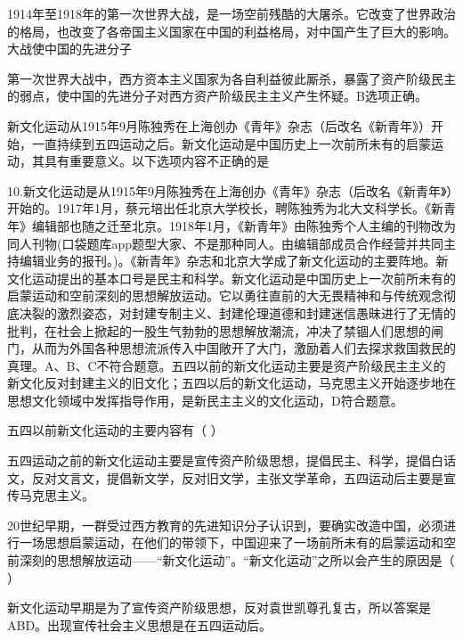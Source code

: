 \question 1914年至1918年的第一次世界大战，是一场空前残酷的大屠杀。它改变了世界政治的格局，也改变了各帝国主义国家在中国的利益格局，对中国产生了巨大的影响。大战使中国的先进分子
\par{}
\begin{solution}第一次世界大战中，西方资本主义国家为各自利益彼此厮杀，暴露了资产阶级民主的弱点，使中国的先进分子对西方资产阶级民主主义产生怀疑。B选项正确。
\end{solution}
\question 新文化运动从1915年9月陈独秀在上海创办《青年》杂志（后改名《新青年》）开始，一直持续到五四运动之后。新文化运动是中国历史上一次前所未有的启蒙运动，其具有重要意义。以下选项内容不正确的是
\par{}
\begin{solution}10.新文化运动是从1915年9月陈独秀在上海创办《青年》杂志（后改名《新青年》）开始的。1917年1月，蔡元培出任北京大学校长，聘陈独秀为北大文科学长。《新青年》编辑部也随之迁至北京。1918年1月，《新青年》由陈独秀个人主编的刊物改为同人刊物(口袋题库app题型大家、不是那种同人。由编辑部成员合作经营并共同主持编辑业务的报刊。)。《新青年》杂志和北京大学成了新文化运动的主要阵地。新文化运动提出的基本口号是民主和科学。新文化运动是中国历史上一次前所未有的启蒙运动和空前深刻的思想解放运动。它以勇往直前的大无畏精神和与传统观念彻底决裂的激烈姿态，对封建专制主义、封建伦理道德和封建迷信愚昧进行了无情的批判，在社会上掀起的一股生气勃勃的思想解放潮流，冲决了禁锢人们思想的闸门，从而为外国各种思想流派传入中国敞开了大门，激励着人们去探求救国救民的真理。A、B、C不符合题意。五四以前的新文化运动主要是资产阶级民主主义的新文化反对封建主义的旧文化；五四以后的新文化运动，马克思主义开始逐步地在思想文化领域中发挥指导作用，是新民主主义的文化运动，D符合题意。
\end{solution}
\question 五四以前新文化运动的主要内容有（ ）
\par{}
\begin{solution}五四运动之前的新文化运动主要是宣传资产阶级思想，提倡民主、科学，提倡白话文，反对文言文，提倡新文学，反对旧文学，主张文学革命，五四运动后主要是宣传马克思主义。
\end{solution}
\question 20世纪早期，一群受过西方教育的先进知识分子认识到，要确实改造中国，必须进行一场思想启蒙运动，在他们的带领下，中国迎来了一场前所未有的启蒙运动和空前深刻的思想解放运动------``新文化运动''。``新文化运动''之所以会产生的原因是（
）
\par{}
\begin{solution}新文化运动早期是为了宣传资产阶级思想，反对袁世凯尊孔复古，所以答案是ABD。出现宣传社会主义思想是在五四运动后。
\end{solution}
